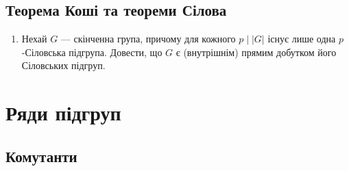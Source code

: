 \documentclass{math_library}
\begin{document}
\subsection{Теорема Коші та теореми Сілова}
\begin{enumerate}[wide=0pt,label=\thesubsection.\arabic*]
\item Нехай $G$ --- скінченна група, причому для кожного $p \mid |G|$ існує лише одна $p$-Сіловська підгрупа. Довести, що $G$ є (внутрішнім) прямим добутком його Сіловських підгруп.
\end{enumerate}
\newpage

\section{Ряди підгруп}
\subsection{Комутанти}
\end{document}
